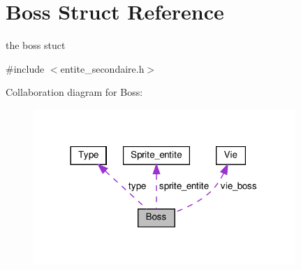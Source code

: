 \hypertarget{structBoss}{}\section{Boss Struct Reference}
\label{structBoss}


the boss stuct  




{\ttfamily \#include $<$entite\+\_\+secondaire.\+h$>$}



Collaboration diagram for Boss\+:
\nopagebreak
\begin{figure}[H]
\begin{center}
\leavevmode
\includegraphics[width=281pt]{structBoss__coll__graph}
\end{center}
\end{figure}
